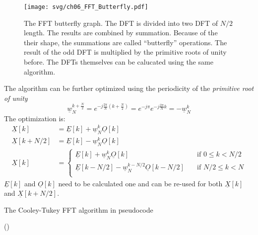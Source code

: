 \begin{refsection}
\begin{figure}[H]
	\centering
	\texttt{[image: svg/ch06\_FFT\_Butterfly.pdf]}
	\caption[The FFT butterfly graph]{The \acs{FFT} butterfly graph. The \acs{DFT} is divided into two \ac{DFT} of $N/2$ length. The results are combined by summation. Because of the their shape, the summations are called ``butterfly'' operations. The result of the odd \ac{DFT} is multiplied by the primitive roots of unity before. The \acp{DFT} themselves can be calucated using the same algorithm. }
\end{figure}

The algorithm can be further optimized using the periodicity of the \emph{primitive root of unity}
\begin{equation}
	\underline{w}_N^{k+\frac{N}{2}} = e^{- j \frac{2 \pi}{N} \left(k+\frac{N}{2}\right)} = e^{- j \pi} e^{- j \frac{2 \pi}{N} k} = -\underline{w}_N^k
\end{equation}
The optimization is:
\begin{equation}
	\begin{split}
		\underline{X}[k] &= \underline{E}[k] + \underline{w}_N^k \underline{O}[k] \\
		\underline{X}[k + N/2] &= \underline{E}[k] - \underline{w}_N^k \underline{O}[k] \\
		\underline{X}[k] &= \begin{cases}
			\underline{E}[k] + \underline{w}_N^k \underline{O}[k] &\quad \text{if } 0 \leq k < N/2 \\
			\underline{E}[k-N/2] - \underline{w}_N^{k-N/2} \underline{O}[k-N/2] &\quad \text{if } N/2 \leq k < N \\
		\end{cases}
	\end{split}
\end{equation}
$\underline{E}[k]$ and $\underline{O}[k]$ need to be calculated one and can be re-used for both $\underline{X}[k]$ and $\underline{X}[k + N/2]$.

\begin{algorithm}[H]
	\caption{The Cooley-Tukey \acs{FFT} algorithm in pseudocode}
	
	\DontPrintSemicolon
	
	\Fn(){}{
		
}
\end{algorithm}
\end{refsection}
